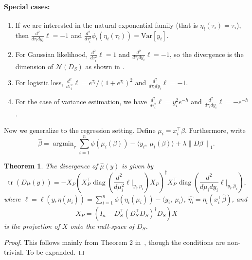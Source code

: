 \documentclass[11pt]{article}
\DeclareMathOperator*{\argmin}{argmin}
\newcommand{\norm}[1]{\left\lVert #1 \right\rVert}
\renewcommand{\hat}{\widehat}
\DeclareMathOperator*{\trace}{tr}
\DeclareMathOperator*{\diag}{diag}
\newtheorem{theorem}{Theorem}[result]
\begin{document}
\paragraph{Special cases:}
\begin{enumerate}
\item If we are interested in the natural exponential family (that is
  $\eta_i(\tau_i)=\tau_i$), then $\frac{d^2}{d\tau_i d y_i} \ell = -1$
  and $\frac{d^2}{d\tau_i^2}\phi_i(\eta_i(\tau_i)) = \textrm{Var}[y_i]$.
\item For Gaussian likelihood, $\frac{d^2}{d\tau_i^2}\ell = 1$
  and $\frac{d^2}{d\tau_i d y_i} \ell = -1$, so the divergence is the
  dimension of $\mathcal{N}(D_S)$ as shown in
  \citet{TibshiraniTaylor2012}. 
\item For logistic loss, $\frac{d^2}{d\tau_i^2}\ell =
  e^{\tau_i}/(1+e^{\tau_i})^2$ and 
  $\frac{d^2}{d\tau_i d y_i} \ell = -1$.
\item For the case of variance estimation, we have $\frac{d^2}{d\tau_i^2}\ell =
  y^2_ie^{-h}$ and 
  $\frac{d^2}{d\tau_i d y_i} \ell = -e^{-h}$.
\end{enumerate}

Now we generalize to the regression setting. Define
$\mu_i = x_i^\top \beta$. Furthermore, write
\begin{equation}
  \label{eq:4}
  \hat\beta = \argmin_\tau \sum_{i=1}^n \phi(\mu_i(\beta)) - \langle y_i,\
  \mu_i(\beta)\rangle + \lambda\norm{D\beta}_1.
\end{equation}


\begin{theorem}
  The divergence of $\hat\mu(y)$ is given by
  \begin{equation}
    \label{eq:5}
    \trace\left(D \hat\mu(y)\right) = -X_P \left(X^\top_P
      \diag\left(\frac{d^2}{d\mu_i^2}\ell
        \vert_{y_i,\hat{\mu}_i}\right) X_P\right)^\dagger X^\top_P
      \diag\left(\frac{d^2}{d\mu_i d y_i} \ell \vert_{y_i,\hat{\mu}_i}\right),
    \end{equation}
    where $\ell = \ell(y,\eta(\mu_i)) = \sum_{i=1}^n \phi(\eta_i(\mu_i)) - \langle y_i,\
    \mu_i\rangle$, $\hat{\eta_i} = \eta_i(x_i^\top\hat\beta)$, and 
    \begin{equation}
      \label{eq:6}
      X_P =( I_n - D_S^\top (D_S^\top D_S)^\dagger D_S) X
    \end{equation}
    is the projection of $X$ onto the null-space of $D_S$.
\end{theorem}

\begin{proof}
  This follows mainly from Theorem 2 in~\citep{VaiterDeledalle2017},
  though the conditions are non-trivial. To be expanded.
\end{proof}




\end{document}
